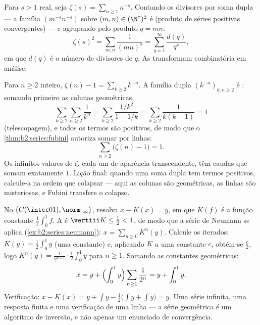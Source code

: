 \begin{example}\label{ex:b2:series:doublesum}
Para $s > 1$ real, seja $\zeta(s) = \sum_{n\geq1} n^{-s}$. Contando os
divisores por soma dupla --- a família $(m^{-s}n^{-s})$ sobre
$(m,n) \in (\N^*)^2$ é  (produto de séries positivas
convergentes) --- e agrupando pelo produto $q = mn$:
\[
\zeta(s)^2 = \sum_{m,n} \frac{1}{(mn)^s}
= \sum_{q=1}^{\infty} \frac{d(q)}{q^s},
\]
em que $d(q)$ é o número de divisores de $q$. As 
transformam combinatória em análise.
\end{example}

\begin{example}[Uma avaliação por Fubini: $\sum_n (\zeta(n) - 1) = 1$]\label{ex:b2:series:zetasum}
Para $n \geq 2$ inteiro, $\zeta(n) - 1 = \sum_{k \geq 2} k^{-n}$.
A família dupla $(k^{-n})_{k, n \geq 2}$ é : somando
primeiro as colunas geométricas,
\[
\sum_{k\geq2}\sum_{n\geq2} \frac{1}{k^n}
= \sum_{k\geq2} \frac{1/k^2}{1 - 1/k}
= \sum_{k\geq2} \frac{1}{k(k-1)} = 1
\]
(telescopagem), e todos os termos são positivos, de modo que o
\cref{thm:b2:series:fubini} autoriza somar por linhas:
\[
\sum_{n\geq2}\bigl(\zeta(n) - 1\bigr) = 1 .
\]
Os infinitos valores de $\zeta$, cada um de aparência transcendente,
têm caudas que somam exatamente $1$. Lição final: quando uma
soma dupla tem termos positivos, calcule-a na ordem que
colapsar --- aqui as colunas são geométricas, as linhas são misteriosas,
e Fubini transfere o colapso.
\end{example}

\begin{example}\label{ex:b2:series:neumannsolve}
No  $\bigl(C(\intcc01),
\norm\cdot_\infty\bigr)$, resolva $x - K(x) = y$, em que $K(f)$ é
a função constante $\frac12\int_0^1 f$. A  é
$\vertiii K \leq \frac12 < 1$, de modo que a série de Neumann se aplica
(\cref{ex:b2:series:neumann}): $x = \sum_{n\geq0} K^n(y)$.
Calcule os iterados: $K(y) = \frac12\int_0^1 y$ (uma constante) e,
aplicando $K$ a uma constante $c$, obtém-se $\frac c2$, logo
$K^n(y) = \frac{1}{2^{n-1}}\cdot\frac12\int_0^1 y$ para $n \geq
1$. Somando as constantes geométricas:
\[
x = y + \Bigl(\int_0^1 y\Bigr)
\sum_{n\geq1}\frac{1}{2^n} = y + \int_0^1 y .
\]
Verificação: $x - K(x) = y + \int y - \frac12\bigl(\int y + \int
y\bigr) = y$. Uma série infinita, uma resposta finita e uma
verificação de uma linha --- a série geométrica é um algoritmo de inversão,
e não apenas um enunciado de convergência.
\end{example}

